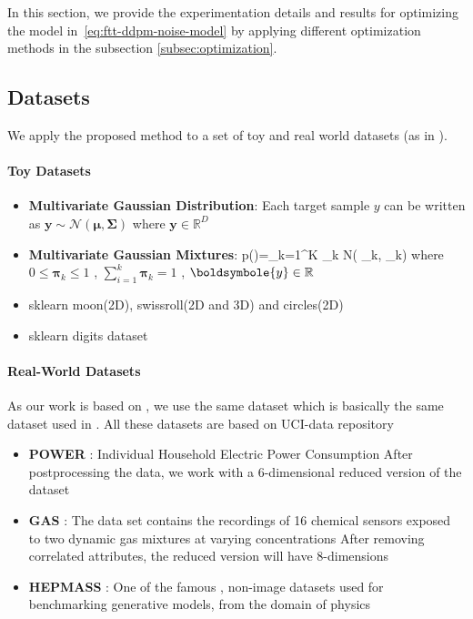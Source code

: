 \documentclass[11pt]{article}
\begin{document}
    In this section, we provide the experimentation details and results for optimizing the model in~\eqref{eq:ftt-ddpm-noise-model}
    by applying different optimization methods in the subsection \ref{subsec:optimization}.


    \subsection{Datasets}\label{subsec:datasets}
    We apply the proposed method to a set of toy and real world datasets (as in \cite{novikov2022tensortrain}).

    \paragraph{Toy Datasets}
    \begin{itemize}
        \item \textbf{Multivariate Gaussian Distribution}:
        Each target sample $y$ can be written as $\mathbf{y} \sim \mathcal{N}(\bm{\mu},\bm{\Sigma})$ where $\mathbf{y} \in \mathbb{R}^{D}$
        \item \textbf{Multivariate Gaussian Mixtures}: \cite{Ch92Mixt66:online}
        p()=\sum_{k=1}^K \boldsymbol{\pi}_k N\left( \mid \boldsymbol{\mu}_k, \boldsymbol{\Sigma}_k\right)
        where $ 0 \leq \boldsymbol{\pi}_k \leq 1$ , $\sum_{i=1}^{k} \boldsymbol{\pi}_k =1$ , $\boldsymbole{y} \in \mathbb{R}$
        \item  sklearn moon(2D), swissroll(2D and 3D) and circles(2D) \cite{APIRefer67:online}
        \item sklearn digits dataset \cite{sklearnd40:online}
    \end{itemize}

    \paragraph{Real-World Datasets}
    As our work is based on \cite{novikov2022tensortrain}, we use the same dataset which is basically the same dataset
    used in \cite{papamakarios2018masked}.
    All these datasets are based on UCI-data repository \cite{Datasets50:online}
    \begin{itemize}
        \item \textbf{POWER} : Individual Household Electric Power Consumption \cite{misc_individual_household_electric_power_consumption_235}
        After postprocessing the data, we work with a 6-dimensional reduced version of the dataset
        \item \textbf{GAS} : The data set contains the recordings of 16 chemical sensors exposed to two dynamic gas mixtures at varying concentrations
        After removing correlated attributes, the reduced version will have 8-dimensions
        \item \textbf{HEPMASS} : One of the famous , non-image datasets used for benchmarking generative models,
        from the domain of physics \cite{UCIHEPMA22:online,bigdeli2020learning}
    \end{itemize}
\end{document}
